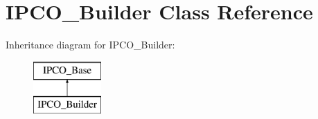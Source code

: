 \hypertarget{class_i_p_c_o___builder}{\section{I\-P\-C\-O\-\_\-\-Builder Class Reference}
\label{class_i_p_c_o___builder}
}
Inheritance diagram for I\-P\-C\-O\-\_\-\-Builder\-:\begin{figure}[H]
\begin{center}
\leavevmode
\includegraphics[height=2.000000cm]{class_i_p_c_o___builder}
\end{center}
\end{figure}
